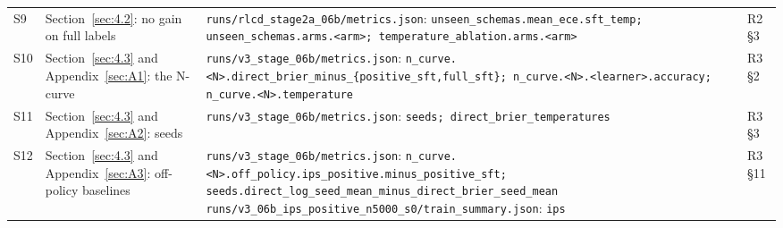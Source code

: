 \documentclass[10pt,letterpaper]{article}
\theoremstyle{plain}
\begin{document}
{\begin{longtable}{@{}p{}>{\raggedright\arraybackslash}p{}>{\raggedright\arraybackslash}p{}>{\raggedright\arraybackslash}p{}@{}}
S9 & Section~\ref{sec:4.2}: no gain on full labels & \texttt{runs/\allowbreak{}rlcd\_\allowbreak{}stage2a\_\allowbreak{}06b/\allowbreak{}metrics.\allowbreak{}json}: \texttt{unseen\_\allowbreak{}schemas.\allowbreak{}mean\_\allowbreak{}ece.\allowbreak{}sft\_\allowbreak{}temp;\allowbreak{} unseen\_\allowbreak{}schemas.\allowbreak{}arms.\allowbreak{}\textless{}arm\textgreater{};\allowbreak{} temperature\_\allowbreak{}ablation.\allowbreak{}arms.\allowbreak{}\textless{}arm\textgreater{}} & R2 \S3 \\
S10 & Section~\ref{sec:4.3} and Appendix~\ref{sec:A1}: the N-curve & \texttt{runs/\allowbreak{}v3\_\allowbreak{}stage\_\allowbreak{}06b/\allowbreak{}metrics.\allowbreak{}json}: \texttt{n\_\allowbreak{}curve.\allowbreak{}\textless{}N\textgreater{}.\allowbreak{}direct\_\allowbreak{}brier\_\allowbreak{}minus\_\allowbreak{}\{positive\_\allowbreak{}sft,full\_\allowbreak{}sft\};\allowbreak{} n\_\allowbreak{}curve.\allowbreak{}\textless{}N\textgreater{}.\allowbreak{}\textless{}learner\textgreater{}.\allowbreak{}accuracy;\allowbreak{} n\_\allowbreak{}curve.\allowbreak{}\textless{}N\textgreater{}.\allowbreak{}temperature} & R3 \S2 \\
S11 & Section~\ref{sec:4.3} and Appendix~\ref{sec:A2}: seeds & \texttt{runs/\allowbreak{}v3\_\allowbreak{}stage\_\allowbreak{}06b/\allowbreak{}metrics.\allowbreak{}json}: \texttt{seeds;\allowbreak{} direct\_\allowbreak{}brier\_\allowbreak{}temperatures} & R3 \S3 \\
S12 & Section~\ref{sec:4.3} and Appendix~\ref{sec:A3}: off-policy baselines & \texttt{runs/\allowbreak{}v3\_\allowbreak{}stage\_\allowbreak{}06b/\allowbreak{}metrics.\allowbreak{}json}: \texttt{n\_\allowbreak{}curve.\allowbreak{}\textless{}N\textgreater{}.\allowbreak{}off\_\allowbreak{}policy.\allowbreak{}ips\_\allowbreak{}positive.\allowbreak{}minus\_\allowbreak{}positive\_\allowbreak{}sft;\allowbreak{} seeds.\allowbreak{}direct\_\allowbreak{}log\_\allowbreak{}seed\_\allowbreak{}mean\_\allowbreak{}minus\_\allowbreak{}direct\_\allowbreak{}brier\_\allowbreak{}seed\_\allowbreak{}mean} \newline \texttt{runs/\allowbreak{}v3\_\allowbreak{}06b\_\allowbreak{}ips\_\allowbreak{}positive\_\allowbreak{}n5000\_\allowbreak{}s0/\allowbreak{}train\_\allowbreak{}summary.\allowbreak{}json}: \texttt{ips} & R3 \S11 \\

\end{longtable}}
\end{document}

